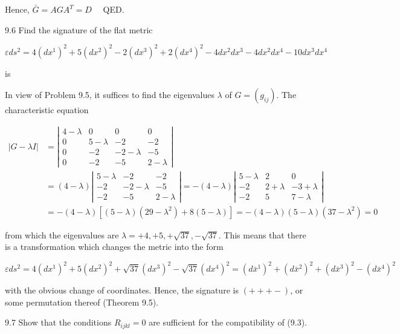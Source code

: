 \documentclass[10pt]{article}
\begin{document}
Hence, $\bar{G}=A G A^{T}=D \quad$ QED.

9.6 Find the signature of the flat metric

$$
\varepsilon d s^{2}=4\left(d x^{1}\right)^{2}+5\left(d x^{2}\right)^{2}-2\left(d x^{3}\right)^{2}+2\left(d x^{4}\right)^{2}-4 d x^{2} d x^{3}-4 d x^{2} d x^{4}-10 d x^{3} d x^{4}
$$

is

In view of Problem 9.5, it suffices to find the eigenvalues $\lambda$ of $G=\left(g_{i j}\right)$. The characteristic equation

$$
\begin{aligned}
|G-\lambda I| & =\left|\begin{array}{cccc}
4-\lambda & 0 & 0 & 0 \\
0 & 5-\lambda & -2 & -2 \\
0 & -2 & -2-\lambda & -5 \\
0 & -2 & -5 & 2-\lambda
\end{array}\right| \\
& =(4-\lambda)\left|\begin{array}{ccc}
5-\lambda & -2 & -2 \\
-2 & -2-\lambda & -5 \\
-2 & -5 & 2-\lambda
\end{array}\right|=-(4-\lambda)\left|\begin{array}{ccc}
5-\lambda & 2 & 0 \\
-2 & 2+\lambda & -3+\lambda \\
-2 & 5 & 7-\lambda
\end{array}\right| \\
& =-(4-\lambda)\left[(5-\lambda)\left(29-\lambda^{2}\right)+8(5-\lambda)\right]=-(4-\lambda)(5-\lambda)\left(37-\lambda^{2}\right)=0
\end{aligned}
$$

from which the eigenvalues are $\lambda=+4,+5,+\sqrt{37},-\sqrt{37}$. This means that there is a transformation which changes the metric into the form

$$
\varepsilon d s^{2}=4\left(d x^{1}\right)^{2}+5\left(d x^{2}\right)^{2}+\sqrt{37}\left(d x^{3}\right)^{2}-\sqrt{37}\left(d x^{4}\right)^{2}=\left(d \bar{x}^{1}\right)^{2}+\left(d \bar{x}^{2}\right)^{2}+\left(d \bar{x}^{3}\right)^{2}-\left(d \bar{x}^{4}\right)^{2}
$$

with the obvious change of coordinates. Hence, the signature is $(+++-)$, or some permutation thereof (Theorem 9.5).

9.7 Show that the conditions $R_{i j k l}=0$ are sufficient for the compatibility of (9.3).
\end{document}
